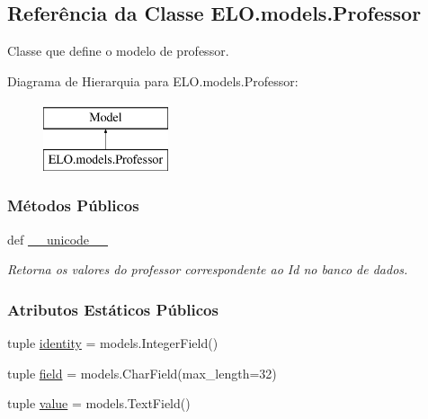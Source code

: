 \hypertarget{classELO_1_1models_1_1Professor}{\subsection{Referência da Classe E\-L\-O.\-models.\-Professor}
\label{classELO_1_1models_1_1Professor}
}


Classe que define o modelo de professor.  


Diagrama de Hierarquia para E\-L\-O.\-models.\-Professor\-:\begin{figure}[H]
\begin{center}
\leavevmode
\includegraphics[height=2.000000cm]{d5/d93/classELO_1_1models_1_1Professor}
\end{center}
\end{figure}
\subsubsection*{Métodos Públicos}
\begin{DoxyCompactItemize}
\item 
def \hyperlink{classELO_1_1models_1_1Professor_aefc9d63d429e19ec3487a7879879f29d}{\-\_\-\-\_\-unicode\-\_\-\-\_\-}
\begin{DoxyCompactList}\small\item\em Retorna os valores do professor correspondente ao Id no banco de dados. \end{DoxyCompactList}\end{DoxyCompactItemize}
\subsubsection*{Atributos Estáticos Públicos}
\begin{DoxyCompactItemize}
\item 
tuple \hyperlink{classELO_1_1models_1_1Professor_a314012619a14c0319c86ba52b6beeb2f}{identity} = models.\-Integer\-Field()
\item 
tuple \hyperlink{classELO_1_1models_1_1Professor_aaf0638dbb44d27f5acadeed376afafa1}{field} = models.\-Char\-Field(max\-\_\-length=32)
\item 
tuple \hyperlink{classELO_1_1models_1_1Professor_abfa283169333876d02cf63886ca872e6}{value} = models.\-Text\-Field()
\end{DoxyCompactItemize}


